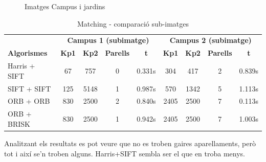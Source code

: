 		\begin{figure}[!htb]
			\caption{Imatges Campus i jardins}
		\end{figure}

		\begin{table}[H]
			\begin{center}
				\begin{tabular}{l | c c c c | c c c c}
					& \multicolumn{4}{c|}{\textbf{Campus 1 (subimatge)}} & \multicolumn{4}{c}{\textbf{Campus 2 (subimatge)}} \\
					\textbf{Algorismes} & \textbf{Kp1} & \textbf{Kp2} & \textbf{Parells} & \textbf{t} & \textbf{Kp1} & \textbf{Kp2} & \textbf{Parells} & \textbf{t} \\ \hline
					Harris + SIFT & 67 & 757 & 0 & 0.331s & 304 & 417 & 2 & 0.839s \\
					SIFT + SIFT & 125 & 5148 & 1 & 0.987s & 570 & 1342 & 5 & 1.113s \\
					ORB + ORB & 830 & 2500 & 2 & 0.840s & 2405 & 2500 & 7 & 0.113s \\
					ORB + BRISK & 830 & 2500 & 1 & 0.942s & 2405 & 2500 & 7 & 1.003s \\
				\end{tabular}
			\end{center}
			\caption{Matching - comparació sub-imatges}
		\end{table}
		\noindent
		Analitzant els resultats es pot veure que no es troben gaires aparellaments, però tot i així se'n troben alguns. Harris+SIFT sembla ser el que en troba menys.

\newpage
